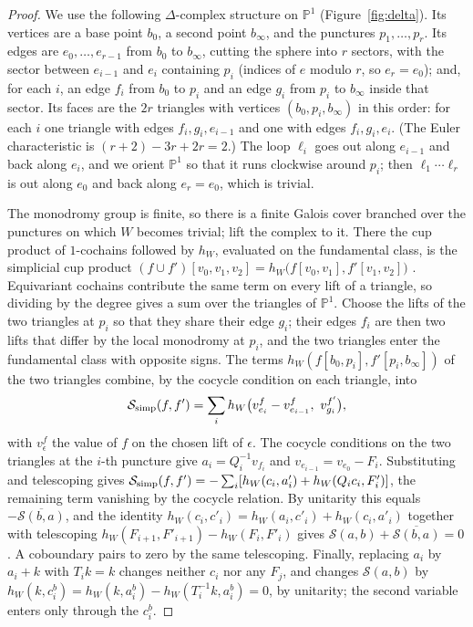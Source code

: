 \documentclass[11pt]{amsart}
\theoremstyle{definition}
\theoremstyle{remark}
\newcommand{\PP}{\mathbb P}
\begin{document}
\begin{proof}
We use the following $\Delta$-complex structure on $\PP^1$ (Figure~\ref{fig:delta}). Its vertices are a base point $b_0$, a second point $b_\infty$, and the punctures $p_1,\dots,p_r$. Its edges are $e_0,\dots,e_{r-1}$ from $b_0$ to $b_\infty$, cutting the sphere into $r$ sectors, with the sector between $e_{i-1}$ and $e_i$ containing $p_i$ (indices of $e$ modulo $r$, so $e_r=e_0$); and, for each $i$, an edge $f_i$ from $b_0$ to $p_i$ and an edge $g_i$ from $p_i$ to $b_\infty$ inside that sector. Its faces are the $2r$ triangles with vertices $(b_0,p_i,b_\infty)$ in this order: for each $i$ one triangle with edges $f_i,g_i,e_{i-1}$ and one with edges $f_i,g_i,e_i$. (The Euler characteristic is $(r+2)-3r+2r=2$.) The loop $\ell_i$ goes out along $e_{i-1}$ and back along $e_i$, and we orient $\PP^1$ so that it runs clockwise around $p_i$; then $\ell_1\cdots\ell_r$ is out along $e_0$ and back along $e_r=e_0$, which is trivial.

The monodromy group is finite, so there is a finite Galois cover branched over the punctures on which $W$ becomes trivial; lift the complex to it. There the cup product of $1$-cochains followed by $h_W$, evaluated on the fundamental class, is the simplicial cup product $(f\cup f')[v_0,v_1,v_2]=h_W\big(f[v_0,v_1],f'[v_1,v_2]\big)$ \cite[\S3.2]{Hatcher}. Equivariant cochains contribute the same term on every lift of a triangle, so dividing by the degree gives a sum over the triangles of $\PP^1$. Choose the lifts of the two triangles at $p_i$ so that they share their edge $g_i$; their edges $f_i$ are then two lifts that differ by the local monodromy at $p_i$, and the two triangles enter the fundamental class with opposite signs. The terms $h_W(f[b_0,p_i],f'[p_i,b_\infty])$ of the two triangles combine, by the cocycle condition on each triangle, into
\[
\mathcal S_{\rm simp}(f,f')=\sum_ih_W\big(v^f_{e_i}-v^f_{e_{i-1}},\ v^{f'}_{g_i}\big),
\]
with $v^f_\epsilon$ the value of $f$ on the chosen lift of $\epsilon$. The cocycle conditions on the two triangles at the $i$-th puncture give $a_i=Q_i^{-1}v_{f_i}$ and $v_{e_{i-1}}=v_{e_0}-F_i$. Substituting and telescoping gives $\mathcal S_{\rm simp}(f,f')=-\sum_i[h_W(c_i,a'_i)+h_W(Q_ic_i,F'_i)]$, the remaining term vanishing by the cocycle relation. By unitarity this equals $-\overline{\mathcal S(b,a)}$, and the identity $h_W(c_i,c'_i)=h_W(a_i,c'_i)+h_W(c_i,a'_i)$ together with telescoping $h_W(F_{i+1},F'_{i+1})-h_W(F_i,F'_i)$ gives $\mathcal S(a,b)+\overline{\mathcal S(b,a)}=0$. A coboundary pairs to zero by the same telescoping. Finally, replacing $a_i$ by $a_i+k$ with $T_ik=k$ changes neither $c_i$ nor any $F_j$, and changes $\mathcal S(a,b)$ by $h_W(k,c^b_i)=h_W(k,a^b_i)-h_W(T_i^{-1}k,a^b_i)=0$, by unitarity; the second variable enters only through the $c^b_i$.
\end{proof}
\end{document}
